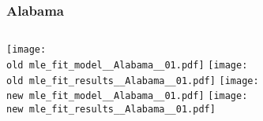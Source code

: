 \documentclass{beamer}
\newcommand{\old}{current_two_stage_output/myplots/}
\newcommand{\new}{new_shortest_t_delta/myplots/}
\begin{document}
\begin{frame}
\frametitle{Alabama}
    \begin{columns}[t]
       \texttt{[image: \\old mle\_fit\_model\_\_Alabama\_\_01.pdf]}
       \texttt{[image: \\old mle\_fit\_results\_\_Alabama\_\_01.pdf]}   
       \texttt{[image: \\new mle\_fit\_model\_\_Alabama\_\_01.pdf]}
       \texttt{[image: \\new mle\_fit\_results\_\_Alabama\_\_01.pdf]}   
\end{columns}
\end{frame}
\end{document}
